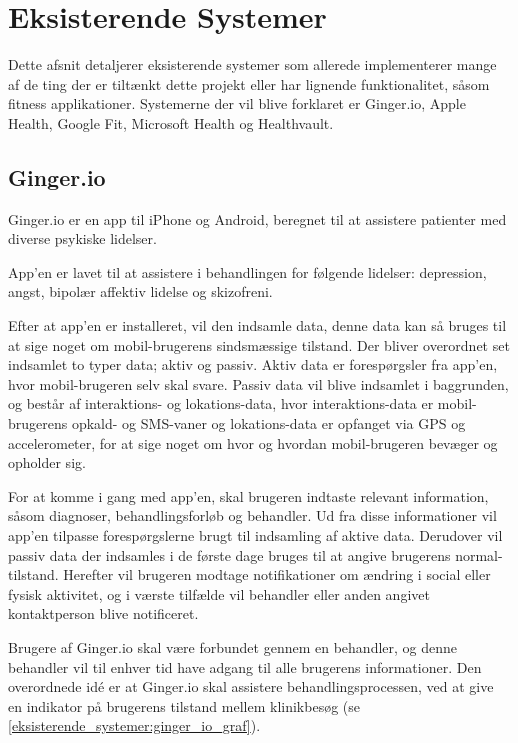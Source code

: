 \section{Eksisterende Systemer}
Dette afsnit detaljerer eksisterende systemer som allerede implementerer mange af de ting der er tiltænkt dette projekt eller har lignende funktionalitet, såsom fitness applikationer. 
Systemerne der vil blive forklaret er Ginger.io, Apple Health, Google Fit, Microsoft Health og Healthvault.

\subsection{Ginger.io}
Ginger.io er en app til iPhone og Android, beregnet til at assistere patienter med diverse psykiske lidelser.\cite{ginger_dot_io}\cite{gingerio_mit}\cite{gingerio_dailymail}


App'en er lavet til at assistere i behandlingen for følgende lidelser: depression, angst, bipolær affektiv lidelse og skizofreni.

Efter at app'en er installeret, vil den indsamle data, denne data kan så bruges til at sige noget om mobil-brugerens sindsmæssige tilstand.
Der bliver overordnet set indsamlet to typer data; aktiv og passiv.
Aktiv data er forespørgsler fra app'en, hvor mobil-brugeren selv skal svare.
Passiv data vil blive indsamlet i baggrunden, og består af interaktions- og lokations-data, hvor interaktions-data er mobil-brugerens opkald- og SMS-vaner og lokations-data er opfanget via GPS og accelerometer, for at sige noget om hvor og hvordan mobil-brugeren bevæger og opholder sig.

For at komme i gang med app'en, skal brugeren indtaste relevant information, såsom diagnoser, behandlingsforløb og behandler.
Ud fra disse informationer vil app'en tilpasse forespørgslerne brugt til indsamling af aktive data.
Derudover vil passiv data der indsamles i de første dage bruges til at angive brugerens normal-tilstand.
Herefter vil brugeren modtage notifikationer om ændring i social eller fysisk aktivitet, og i værste tilfælde vil behandler eller anden angivet kontaktperson blive notificeret.

Brugere af Ginger.io skal være forbundet gennem en behandler, og denne behandler vil til enhver tid have adgang til alle brugerens informationer.
Den overordnede idé er at Ginger.io skal assistere behandlingsprocessen, ved at give en indikator på brugerens tilstand mellem klinikbesøg (se \cref{eksisterende_systemer:ginger_io_graf}).

